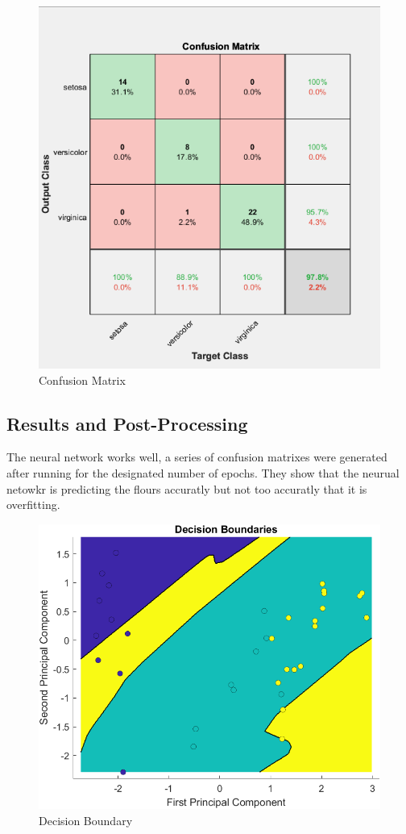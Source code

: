 \documentclass[conference]{inc/IEEEtran}
\begin{document}
\begin{figure}
    \includegraphics[width=\linewidth]{figures/Cm.png}
    \caption{Confusion Matrix}
    \label{fig:boat1}
  \end{figure}

\subsection{Results and Post-Processing}

The neural network works well, a series of confusion matrixes were generated after running for the designated number of epochs. They show that the neurual netowkr is predicting the flours accuratly but not too accuratly that it is overfitting. 

  \begin{figure}
    \includegraphics[width=\linewidth]{figures/DB.png}
    \caption{Decision Boundary}
    \label{fig:boat1}
  \end{figure}
\end{document}
